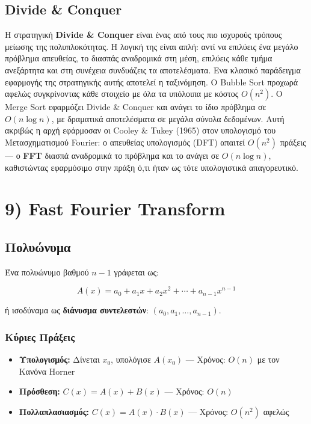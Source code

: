 \documentclass[a4paper, 11pt]{article}
\providecommand{\tightlist}{\setlength{\itemsep}{0pt}\setlength{\parskip}{0pt}}
\begin{document}
\subsection{Divide \& Conquer}\label{divide-conquer}

Η στρατηγική \textbf{Divide \& Conquer} είναι ένας από τους πιο ισχυρούς
τρόπους μείωσης της πολυπλοκότητας. Η λογική της είναι απλή: αντί να
επιλύεις ένα μεγάλο πρόβλημα απευθείας, το διασπάς αναδρομικά στη μέση,
επιλύεις κάθε τμήμα ανεξάρτητα και στη συνέχεια συνδυάζεις τα
αποτελέσματα. Ενα κλασικό παράδειγμα εφαρμογής της στρατηγικής αυτής
αποτελεί η ταξινόμηση. Ο Bubble Sort προχωρά αφελώς συγκρίνοντας κάθε
στοιχείο με όλα τα υπόλοιπα με κόστος \(O(n^2)\). Ο Merge Sort εφαρμόζει
Divide \& Conquer και ανάγει το ίδιο πρόβλημα σε \(O(n \log n)\), με
δραματικά αποτελέσματα σε μεγάλα σύνολα δεδομένων. Αυτή ακριβώς η αρχή
εφάρμοσαν οι Cooley \& Tukey (1965) στον υπολογισμό του Μετασχηματισμού
Fourier: ο απευθείας υπολογισμός (DFT) απαιτεί \(O(n^2)\) πράξεις --- ο
\textbf{FFT} διασπά αναδρομικά το πρόβλημα και το ανάγει σε
\(O(n \log n)\), καθιστώντας εφαρμόσιμο στην πράξη ό,τι ήταν ως τότε
υπολογιστικά απαγορευτικό.

\section{9) Fast Fourier Transform}\label{fast-fourier-transform}

\subsection{Πολυώνυμα}\label{ux3c0ux3bfux3bbux3c5ux3ceux3bdux3c5ux3bcux3b1}

Ένα πολυώνυμο βαθμού \(n-1\) γράφεται ως:

\[A(x) = a_0 + a_1 x + a_2 x^2 + \cdots + a_{n-1} x^{n-1}\]

ή ισοδύναμα ως \textbf{διάνυσμα συντελεστών}:
\((a_0, a_1, \ldots, a_{n-1})\).

\subsubsection{Κύριες
Πράξεις}\label{ux3baux3cdux3c1ux3b9ux3b5ux3c2-ux3c0ux3c1ux3acux3beux3b5ux3b9ux3c2}

\begin{itemize}
\tightlist
\item
  \textbf{Υπολογισμός:} Δίνεται \(x_0\), υπολόγισε \(A(x_0)\) ---
  Χρόνος: \(O(n)\) με τον Κανόνα Horner
\item
  \textbf{Πρόσθεση:} \(C(x) = A(x) + B(x)\) --- Χρόνος: \(O(n)\)
\item
  \textbf{Πολλαπλασιασμός:} \(C(x) = A(x) \cdot B(x)\) --- Χρόνος:
  \(O(n^2)\) αφελώς
\end{itemize}
\end{document}
